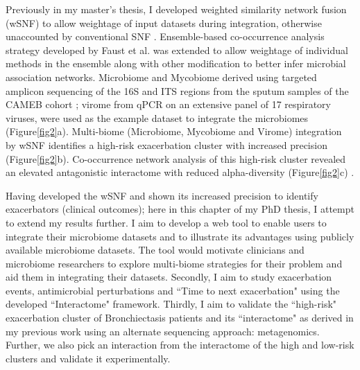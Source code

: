Previously in my master's thesis, I developed weighted similarity network fusion (wSNF) to allow weightage of input datasets during integration, otherwise unaccounted by conventional SNF \cite{Wang2014}. Ensemble-based co-occurrence analysis strategy developed by Faust et al. \cite{Faust2012} was extended to allow weightage of individual methods in the ensemble along with other modification to better infer microbial association networks. Microbiome and Mycobiome derived using targeted amplicon sequencing of the 16S and ITS regions from the sputum samples of the CAMEB cohort \cite{Mac1800766}; virome from qPCR on an extensive panel of 17 respiratory viruses, were used as the example dataset to integrate the microbiomes (Figure\ref{fig2}a). Multi-biome (Microbiome, Mycobiome and Virome) integration by wSNF identifies a high-risk exacerbation cluster with increased precision (Figure\ref{fig2}b). Co-occurrence network analysis of this high-risk cluster revealed an elevated antagonistic interactome with reduced alpha-diversity (Figure\ref{fig2}c) \cite{Narayana2019}.

Having developed the wSNF and shown its increased precision to identify exacerbators (clinical outcomes); here in this chapter of my PhD thesis, I attempt to extend my results further. I aim to develop a web tool to enable users to integrate their microbiome datasets and to illustrate its advantages using publicly available microbiome datasets. The tool would motivate clinicians and microbiome researchers to explore multi-biome strategies for their problem and aid them in integrating their datasets. Secondly, I aim to study exacerbation events, antimicrobial perturbations and ``Time to next exacerbation" using the developed ``Interactome" framework. Thirdly, I aim to validate the ``high-risk" exacerbation cluster of Bronchiectasis patients and its ``interactome" as derived in my previous work \cite{Narayana2019} using an alternate sequencing approach: metagenomics. Further, we also pick an interaction from the interactome of the high and low-risk clusters and validate it experimentally. 
